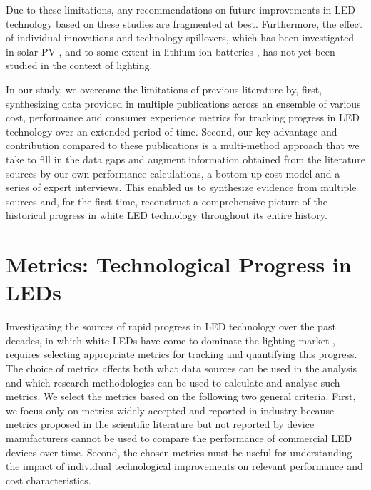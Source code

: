 \documentclass[parskip=full]{article}
\begin{document}
Due to these limitations, any recommendations on future improvements in LED technology based on these studies are fragmented at best. Furthermore, the effect of individual innovations and technology spillovers, which has been investigated in solar PV \cite{kavlak2018evaluating,kolesnikov2021spillovers,nemet2019solar}, and to some extent in lithium-ion batteries \cite{Stephan2021}, has not yet been studied in the context of lighting.

In our study, we overcome the limitations of previous literature by, first, synthesizing data provided in multiple publications across an ensemble of various cost, performance and consumer experience metrics for tracking progress in LED technology over an extended period of time. Second, our key advantage and contribution compared to these publications is a multi-method approach that we take to fill in the data gaps and augment information obtained from the literature sources by our own performance calculations, a bottom-up cost model and a series of expert interviews. This enabled us to synthesize evidence from multiple sources and, for the first time, reconstruct a comprehensive picture of the historical progress in white LED technology throughout its entire history.

\section{Metrics: Technological Progress in LEDs}

Investigating the sources of rapid progress in LED technology over the past decades, in which white LEDs have come to dominate the lighting market \cite{zissis2021}, requires selecting appropriate metrics for tracking and quantifying this progress. The choice of metrics affects both what data sources can be used in the analysis and which research methodologies can be used to calculate and analyse such metrics. We select the metrics based on the following two general criteria. First, we focus only on metrics widely accepted and reported in industry because metrics proposed in the scientific literature but not reported by device manufacturers cannot be used to compare the performance of commercial LED devices over time. Second, the chosen metrics must be useful for understanding the impact of individual technological improvements on relevant performance and cost characteristics.
\end{document}
